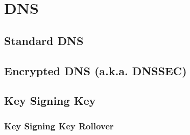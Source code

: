 \chapter{DNS}

\section{Standard DNS}

\section[DNSSEC]{Encrypted DNS (a.k.a. DNSSEC)}

\section[KSK]{Key Signing Key}

\subsection[Rollover]{Key Signing Key Rollover}